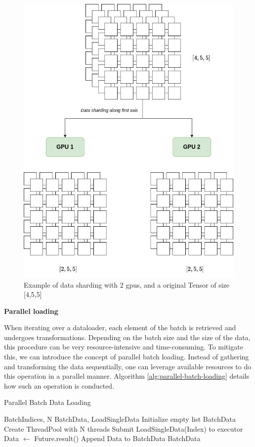 \begin{figure}[!h]
    \centering
    \includegraphics[scale=0.4]{figures/sharding.png}
    \caption{Example of data sharding with 2 gpus, and a original Tensor of size [4,5,5]}
    \label{fig:sharding}
\end{figure}


\textbf{Parallel loading}

When iterating over a dataloader, each element of the batch is retrieved and undergoes transformations. Depending on the batch size and  the size of the data, this procedure can be very resource-intensive and time-consuming. To mitigate this, we can introduce the concept of parallel batch loading. Instead of gathering and transforming the data sequentially, one can leverage available resources to do this operation in a parallel manner. Algorithm \ref{alg:parallel-batch-loading} details how such an operation is conducted.


\begin{algorithm}
\caption{Parallel Batch Data Loading}\label{alg:parallel-batch-loading}
\begin{algorithmic}
\Require BatchIndices, N
\Ensure BatchData, LoadSingleData
\State Initialize empty list BatchData
\State Create ThreadPool with N threads
    \State Submit LoadSingleData(Index) to executor
\EndFor
{}
    \State Data $\gets$ Future.result()
    \State Append Data to BatchData
\EndFor
\State \Return BatchData
\end{algorithmic}
\end{algorithm}